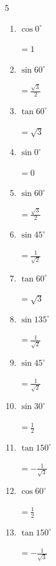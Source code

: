 \begin{multicols}{5}
\begin{enumerate}
\columnbreak %

  \item $\displaystyle \cos{0^\circ}$

        $\displaystyle =1$

  \item $\displaystyle \sin{60^\circ}$

        $\displaystyle =\frac{\sqrt{3}}{2}$

  \item $\displaystyle \tan{60^\circ}$

        $\displaystyle =\sqrt{3}$

  \item $\displaystyle \sin{0^\circ}$

        $\displaystyle =0$

  \item $\displaystyle \sin{60^\circ}$

        $\displaystyle =\frac{\sqrt{3}}{2}$

  \item $\displaystyle \sin{45^\circ}$

        $\displaystyle =\frac{1}{\sqrt{2}}$

  \item $\displaystyle \tan{60^\circ}$

        $\displaystyle =\sqrt{3}$

  \item $\displaystyle \sin{135^\circ}$

        $\displaystyle =\frac{1}{\sqrt{2}}$

  \item $\displaystyle \sin{45^\circ}$

        $\displaystyle =\frac{1}{\sqrt{2}}$

  \item $\displaystyle \sin{30^\circ}$

        $\displaystyle =\frac{1}{2}$

  \item $\displaystyle \tan{150^\circ}$

        $\displaystyle =-\frac{1}{\sqrt{3}}$

  \item $\displaystyle \cos{60^\circ}$

        $\displaystyle =\frac{1}{2}$

  \item $\displaystyle \tan{150^\circ}$

        $\displaystyle =-\frac{1}{\sqrt{3}}$


\end{enumerate}
\end{multicols}
